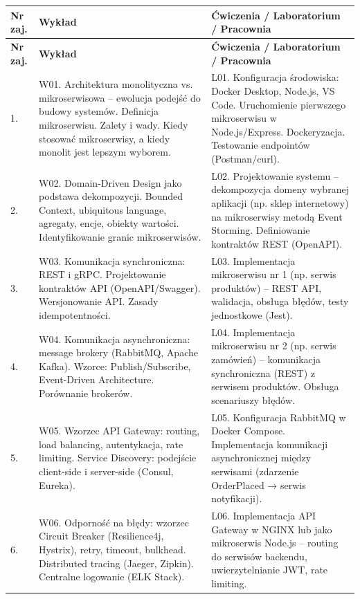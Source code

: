 \documentclass[12pt, a4paper]{article}
\newcommand{\thdrule}{\noalign{\global\setlength{\extrarowheight}{0pt}}}
\newcommand{\thdend}{\noalign{\global\setlength{\extrarowheight}{3pt}}}
\begin{document}
{\scriptsize
\begin{longtable}{m{1.5cm}m{6.5cm}m{6.5cm}}
\thdrule\toprule
\rowcolor{pjatkRed} {\color{white}\textbf{Nr zaj.}} & {\color{white}\textbf{Wykład}} & {\color{white}\textbf{Ćwiczenia / Laboratorium / Pracownia}} \\
\midrule\thdend
\endfirsthead
\thdrule\toprule
\rowcolor{pjatkRed} {\color{white}\textbf{Nr zaj.}} & {\color{white}\textbf{Wykład}} & {\color{white}\textbf{Ćwiczenia / Laboratorium / Pracownia}} \\
\midrule\thdend
\endhead
  \rowcolor{tableRowLight} 1. & W01. Architektura monolityczna vs. mikroserwisowa – ewolucja podejść do budowy systemów. Definicja mikroserwisu. Zalety i wady. Kiedy stosować mikroserwisy, a kiedy monolit jest lepszym wyborem. & L01. Konfiguracja środowiska: Docker Desktop, Node.js, VS Code. Uruchomienie pierwszego mikroserwisu w Node.js/Express. Dockeryzacja. Testowanie endpointów (Postman/curl). \\
  \rowcolor{tableRowAlt} 2. & W02. Domain-Driven Design jako podstawa dekompozycji. Bounded Context, ubiquitous language, agregaty, encje, obiekty wartości. Identyfikowanie granic mikroserwisów. & L02. Projektowanie systemu – dekompozycja domeny wybranej aplikacji (np. sklep internetowy) na mikroserwisy metodą Event Storming. Definiowanie kontraktów REST (OpenAPI). \\
  \rowcolor{tableRowLight} 3. & W03. Komunikacja synchroniczna: REST i gRPC. Projektowanie kontraktów API (OpenAPI/Swagger). Wersjonowanie API. Zasady idempotentności. & L03. Implementacja mikroserwisu nr 1 (np. serwis produktów) – REST API, walidacja, obsługa błędów, testy jednostkowe (Jest). \\
  \rowcolor{tableRowAlt} 4. & W04. Komunikacja asynchroniczna: message brokery (RabbitMQ, Apache Kafka). Wzorce: Publish/Subscribe, Event-Driven Architecture. Porównanie brokerów. & L04. Implementacja mikroserwisu nr 2 (np. serwis zamówień) – komunikacja synchroniczna (REST) z serwisem produktów. Obsługa scenariuszy błędów. \\
  \rowcolor{tableRowLight} 5. & W05. Wzorzec API Gateway: routing, load balancing, autentykacja, rate limiting. Service Discovery: podejście client-side i server-side (Consul, Eureka). & L05. Konfiguracja RabbitMQ w Docker Compose. Implementacja komunikacji asynchronicznej między serwisami (zdarzenie OrderPlaced → serwis notyfikacji). \\
  \rowcolor{tableRowAlt} 6. & W06. Odporność na błędy: wzorzec Circuit Breaker (Resilience4j, Hystrix), retry, timeout, bulkhead. Distributed tracing (Jaeger, Zipkin). Centralne logowanie (ELK Stack). & L06. Implementacja API Gateway w NGINX lub jako mikroserwis Node.js – routing do serwisów backendu, uwierzytelnianie JWT, rate limiting. \\

\end{longtable}}
\end{document}
